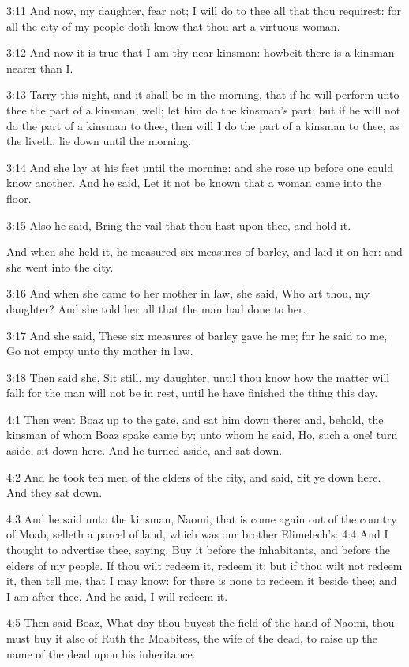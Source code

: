 3:11 And now, my daughter, fear not; I will do to thee all that thou
requirest: for all the city of my people doth know that thou art a
virtuous woman.

3:12 And now it is true that I am thy near kinsman: howbeit there is a
kinsman nearer than I.

3:13 Tarry this night, and it shall be in the morning, that if he will
perform unto thee the part of a kinsman, well; let him do the
kinsman's part: but if he will not do the part of a kinsman to thee,
then will I do the part of a kinsman to thee, as the \LORD liveth: lie
down until the morning.

3:14 And she lay at his feet until the morning: and she rose up before
one could know another. And he said, Let it not be known that a woman
came into the floor.

3:15 Also he said, Bring the vail that thou hast upon thee, and hold
it.

And when she held it, he measured six measures of barley, and laid it
on her: and she went into the city.

3:16 And when she came to her mother in law, she said, Who art thou,
my daughter? And she told her all that the man had done to her.

3:17 And she said, These six measures of barley gave he me; for he
said to me, Go not empty unto thy mother in law.

3:18 Then said she, Sit still, my daughter, until thou know how the
matter will fall: for the man will not be in rest, until he have
finished the thing this day.

4:1 Then went Boaz up to the gate, and sat him down there: and,
behold, the kinsman of whom Boaz spake came by; unto whom he said, Ho,
such a one! turn aside, sit down here. And he turned aside, and sat
down.

4:2 And he took ten men of the elders of the city, and said, Sit ye
down here. And they sat down.

4:3 And he said unto the kinsman, Naomi, that is come again out of the
country of Moab, selleth a parcel of land, which was our brother
Elimelech's: 4:4 And I thought to advertise thee, saying, Buy it
before the inhabitants, and before the elders of my people. If thou
wilt redeem it, redeem it: but if thou wilt not redeem it, then tell
me, that I may know: for there is none to redeem it beside thee; and I
am after thee. And he said, I will redeem it.

4:5 Then said Boaz, What day thou buyest the field of the hand of
Naomi, thou must buy it also of Ruth the Moabitess, the wife of the
dead, to raise up the name of the dead upon his inheritance.

